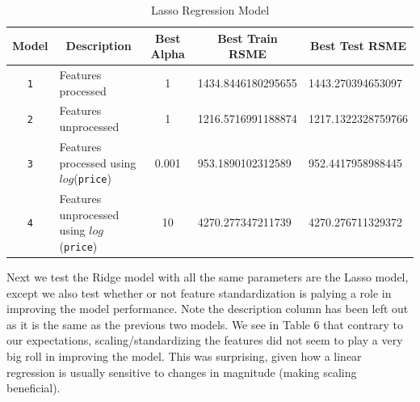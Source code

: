 \documentclass[11pt,letterpaper]{article}
\begin{document}
\begin{table}[H]
    \centering
    \begin{tabular}{clcll}
        \hline
    Model & \multicolumn{1}{c}{Description} & \multicolumn{1}{c}{Best Alpha} & \multicolumn{1}{c}{Best Train RSME} & \multicolumn{1}{c}{Best Test RSME} \\
    \hline
    \texttt{1}     & Features processed       & 1       & 1434.8446180295655                                                     & 1443.270394653097                                                      \\
    \texttt{2}     & Features unprocessed    & 1        & 1216.5716991188874                                                      & 1217.1322328759766
    \\
    \texttt{3}     & Features processed using $log$(\texttt{price})  & 0.001 & 953.1890102312589                                                     & 952.4417958988445                                                       \\
    \texttt{4}     & Features unprocessed using $log$(\texttt{price}) & 10 &  4270.277347211739                                                   & 4270.276711329372                                                   
    \end{tabular}
    \caption{Lasso Regression Model}
\end{table}

Next we test the Ridge model with all the same parameters are the Lasso model, except
we also test whether or not feature standardization is palying a role in improving 
the model performance. Note the description column has been left out as it is the same as the previous 
two models. We see in Table 6 that contrary to our expectations, scaling/standardizing the features did not 
seem to play a very big roll in improving the model. This was surprising, given how a linear regression is 
usually sensitive to changes in magnitude (making scaling beneficial). 
\end{document}
